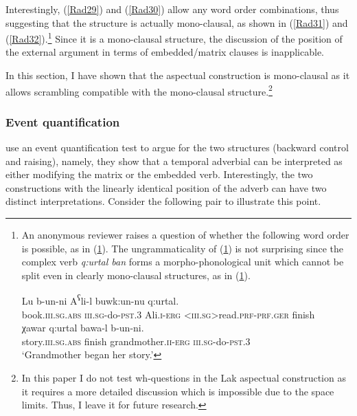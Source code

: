 \documentclass[output=paper]{langscibook}
\begin{document}
Interestingly, (\ref{Rad29}) and (\ref{Rad30}) allow any word order combinations, thus suggesting that the structure is actually mono-clausal, as shown in (\ref{Rad31}) and (\ref{Rad32}).\footnote{An anonymous reviewer raises a question of whether the following word order is possible, as in (\ref{Radi}). The ungrammaticality of (\ref{Radi}) is not surprising since the complex verb \textit{q:urtal ban} forms a morpho-phonological unit which cannot be split even in clearly mono-clausal structures, as in (\ref{Radii}).

\ea\label{Radi}
\gll *Lu b-un-ni A\textsuperscript{ʕ}li-l buwk:un-nu q:urtal.\\
book.\textsc{iii.sg.abs} \textsc{iii.sg}-do-\textsc{pst.3} Ali.\textsc{i-erg}  \textsc{<iii.sg>}read.\textsc{prf-prf.ger} finish\\
\ex\label{Radii}
\gll *χawar q:urtal bawa-l b-un-ni.\\
story.\textsc{iii.sg.abs} finish grandmother.\textsc{ii-erg} 
\textsc{iii.sg}-do-\textsc{pst.3}\\
\glt ‘Grandmother began her story.’
\z}
Since it is a mono-clausal structure, the discussion of the position of the external argument in terms of embedded/matrix clauses is inapplicable.

\ea\label{Rad31}
\z
\ex\label{Rad32}
\z 
\z 


In this section, I have shown that the aspectual construction is mono-clausal as it allows scrambling compatible with the mono-clausal structure.\footnote{In this paper I do not test wh-questions in the Lak aspectual construction as it requires a more detailed discussion which is impossible due to the space limits. Thus, I leave it for future research.}

\subsubsection{Event quantification}
\citet{PolinskyPotsdam2002} use an event quantification test to argue for the two structures (backward control and raising), namely, they show that a temporal adverbial can be interpreted as either modifying the matrix or the embedded verb. Interestingly, the two constructions with the linearly identical position of the adverb can have two distinct interpretations. Consider the following pair to illustrate this point.
\end{document}
